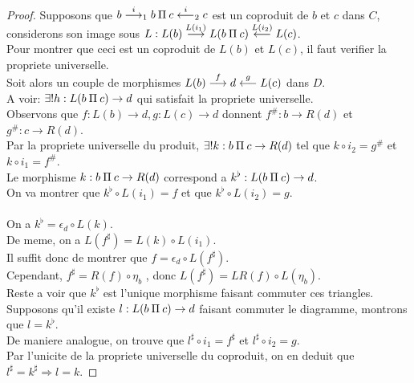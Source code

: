 \documentclass[../main.tex]{subfiles}
\begin{document}
\begin{proof}
	Supposons que $b \overset{i}{\longrightarrow}_1 b \mathbin{\Pi} c \overset{i}{\longleftarrow}_2 c$ est un coproduit de $b$ et $c$ dans $C$, considerons son image sous $L: L( b) \overset{ L( i_1) }{\longrightarrow} L( b\mathbin{\Pi} c) \overset{ L( i_2) }{\longleftarrow} L( c) $.\\
	Pour montrer que ceci est un coproduit de $L( b) $ et $L( c) $, il faut verifier la propriete universelle.\\
	Soit alors un couple de morphismes $L( b) \overset{f}{\longrightarrow} d \overset{g}{\longleftarrow} L( c) $ dans $D$.\\
	A voir: $\exists ! h : L( b\mathbin{\Pi} c) \to d$ qui satisfait la propriete universelle.\\
	Observons que $f: L( b) \to d, g: L( c) \to d$ donnent $f^{\#}: b \to R( d) $ et $g^{\#}: c \to R( d) $.\\
	Par la propriete universelle du produit, $\exists! k : b \mathbin{\Pi} c \to R( d) $ tel que $k\circ i_2 = g^{\#}$ et $k\circ i_1= f^{\#}$.\\
	Le morphisme $k: b \mathbin{\Pi} c \to R( d) $ correspond a $k^{\flat}: L( b \mathbin{\Pi} c ) \to d$.\\
	On va montrer que $ k^{\flat}\circ L( i_1) = f$ et que $k^{\flat}\circ L( i_2) = g$.\\
\hr\\
On a $k^{\flat}= \epsilon_d \circ L( k) $.\\
De meme, on a $L( f^{\sharp}) = L( k) \circ L( i_1) $.\\
Il suffit donc de montrer que $f= \epsilon_d \circ L( f^{\sharp}) $.\\
Cependant, $f^{\sharp}= R( f) \circ \eta_b$ , donc $L( f^{\sharp}) = LR( f) \circ L( \eta_b) $.\\
Reste a voir que $k^{\flat}$ est l'unique morphisme faisant commuter ces triangles.\\
Supposons qu'il existe $l: L( b\mathbin{\Pi} c) \to d$ faisant commuter le diagramme, montrons que $l= k^{\flat}$.\\
De maniere analogue, on trouve que $l^{\sharp}\circ i_1= f^{\sharp}$ et $l^{\sharp}\circ i_2= g$.\\
Par l'unicite de la propriete universelle du coproduit, on en deduit que $l^{\sharp}= k^{\sharp} \Rightarrow l = k$.
\end{proof}



			
\end{document}
